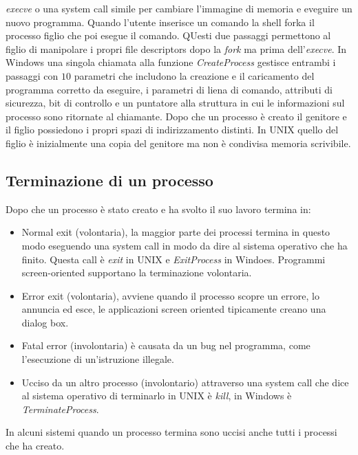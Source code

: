 \emph{execve} o una system call simile per cambiare l'immagine di memoria e eveguire un nuovo programma. Quando l'utente inserisce un comando la shell forka il processo figlio che poi
esegue il comando. QUesti due passaggi permettono al figlio di manipolare i propri file descriptors dopo la \emph{fork} ma prima dell'\emph{execve}. In Windows una singola chiamata alla
funzione \emph{CreateProcess} gestisce entrambi i passaggi con $10$ parametri che includono la creazione e il caricamento del programma corretto da eseguire, i parametri di liena di 
comando, attributi di sicurezza, bit di controllo e un puntatore alla struttura in cui le informazioni sul processo sono ritornate al chiamante. Dopo che un processo \`e creato 
il genitore e il figlio possiedono i propri spazi di indirizzamento distinti. In UNIX quello del figlio \`e inizialmente una copia del genitore ma non \`e condivisa memoria scrivibile.
\subsection{Terminazione di un processo}
Dopo che un processo \`e stato creato e ha svolto il suo lavoro termina in:
\begin{itemize}
	\item Normal exit (volontaria), la maggior parte dei processi termina in questo modo eseguendo una system call in modo da dire al sistema operativo che ha finito. 
		Questa call \`e \emph{exit} in UNIX e \emph{ExitProcess} in Windoes. Programmi screen-oriented supportano la terminazione volontaria. 
	\item Error exit (volontaria), avviene quando il processo scopre un errore, lo annuncia ed esce, le applicazioni screen oriented tipicamente creano una dialog box.
	\item Fatal error (involontaria) \`e causata da un bug nel programma, come l'esecuzione di un'istruzione illegale. 
	\item Ucciso da un altro processo (involontario) attraverso una system call che dice al sistema operativo di terminarlo in UNIX \`e \emph{kill}, in Windows \`e 
		\emph{TerminateProcess}. 
\end{itemize}
In alcuni sistemi quando un processo termina sono uccisi anche tutti i processi che ha creato. 
